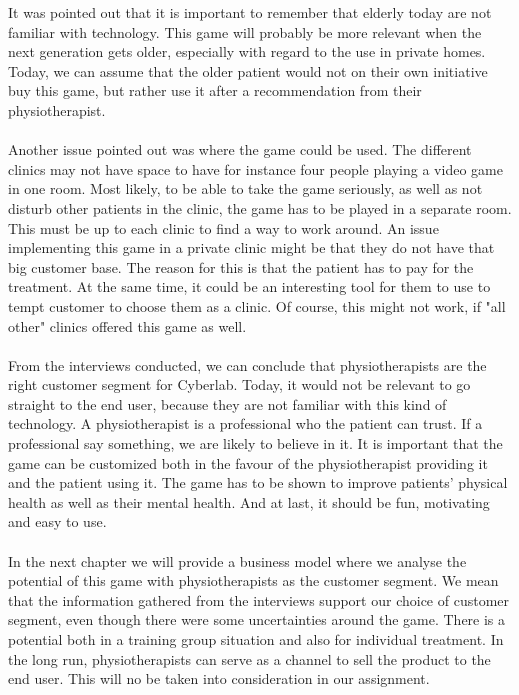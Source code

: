 It was pointed out that it is important to remember that elderly today are not familiar with technology. This game will probably be more relevant when the next generation gets older, especially with regard to the use in private homes. Today, we can assume that the older patient would not on their own initiative buy this game, but rather use it after a recommendation from their physiotherapist. \\ \\
Another issue pointed out was where the game could be used. The different clinics may not have space to have for instance four people playing a video game in one room. Most likely, to be able to take the game seriously, as well as not disturb other patients in the clinic, the game has to be played in a separate room. This must be up to each clinic to find a way to work around. An issue implementing this game in a private clinic might be that they do not have that big customer base. The reason for this is that the patient has to pay for the treatment. At the same time, it could be an interesting tool for them to use to tempt customer to choose them as a clinic. Of course, this might not work, if "all other" clinics offered this game as well. \\ \\
From the interviews conducted, we can conclude that physiotherapists are the right customer segment for Cyberlab. Today, it would not be relevant to go straight to the end user, because they are not familiar with this kind of technology. A physiotherapist is a professional who the patient can trust. If a professional say something, we are likely to believe in it.  It is important that the game can be customized both in the favour of the physiotherapist providing it and the patient using it. The game has to be shown to improve patients' physical health as well as their mental health. And at last, it should be fun, motivating and easy to use. \\ \\
In the next chapter we will provide a business model where we analyse the potential of this game with physiotherapists as the customer segment. We mean that the information gathered from the interviews support our choice of customer segment, even though there were some uncertainties around the game. There is a potential both in a training group situation and also for individual treatment. In the long run, physiotherapists can serve as a channel to sell the product to the end user. This will no be taken into consideration in our assignment. 